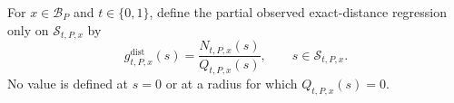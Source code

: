 For \(x\in\mathcal B_P\) and \(t\in\{0,1\}\), define the partial observed exact-distance regression only on \(\mathcal S_{t,P,x}\) by
\[
 g^{\mathrm{dist}}_{t,P,x}(s)
 =\frac{N_{t,P,x}(s)}{Q_{t,P,x}(s)},
 \qquad s\in\mathcal S_{t,P,x}.
\]
No value is defined at \(s=0\) or at a radius for which \(Q_{t,P,x}(s)=0\).